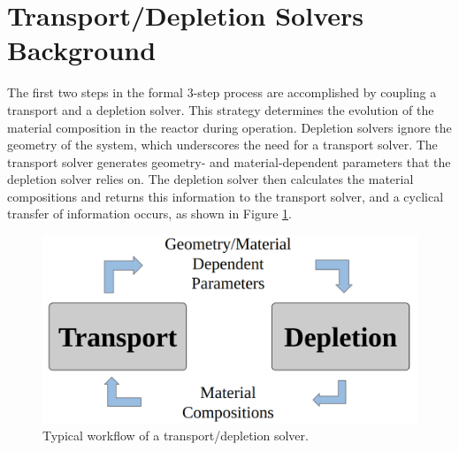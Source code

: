 

\section{Transport/Depletion Solvers Background}


The first two steps in the formal 3-step process are accomplished by coupling a transport and a depletion solver.
This strategy determines the evolution of the material composition in the reactor during operation.
Depletion solvers ignore the geometry of the system, which underscores the need for a transport solver.
The transport solver generates geometry- and material-dependent parameters that the depletion solver relies on.
The depletion solver then calculates the material compositions and returns this information to the transport solver, and a cyclical transfer of information occurs, as shown in Figure \ref{fig:trans-dep}.

\begin{figure}[htbp!]
  \begin{center}
    \includegraphics[scale=0.3]{figures/diagram_1}
  \end{center}
  \caption{Typical workflow of a transport/depletion solver.}
  \label{fig:trans-dep}
\end{figure}


